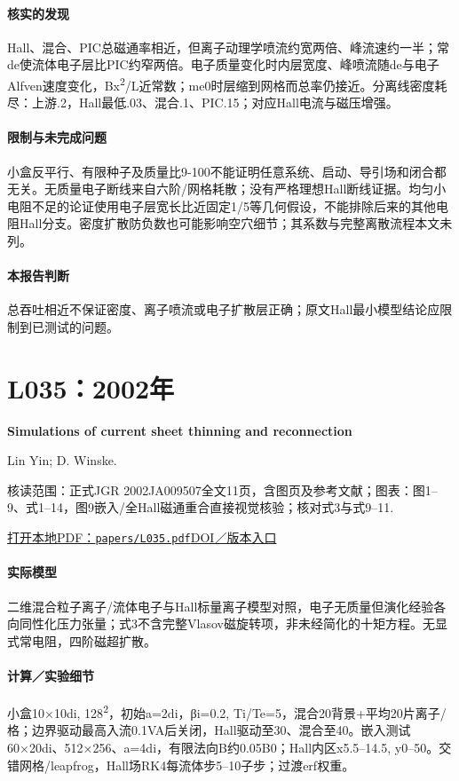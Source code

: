 \paragraph{核实的发现}Hall、混合、PIC总磁通率相近，但离子动理学喷流约宽两倍、峰流速约一半；常de使流体电子层比PIC约窄两倍。电子质量变化时内层宽度、峰喷流随de与电子Alfven速度变化，Bx\textsuperscript{2}/L近常数；me0时层缩到网格而总率仍接近。分离线密度耗尽：上游.2，Hall最低.03、混合.1、PIC.15；对应Hall电流与磁压增强。

\paragraph{限制与未完成问题}小盒反平行、有限种子及质量比9-100不能证明任意系统、启动、导引场和闭合都无关。无质量电子断线来自六阶/网格耗散；没有严格理想Hall断线证据。均匀小电阻不足的论证使用电子层宽长比近固定1/5等几何假设，不能排除后来的其他电阻Hall分支。密度扩散防负数也可能影响空穴细节；其系数与完整离散流程本文未列。

\paragraph{本报告判断}总吞吐相近不保证密度、离子喷流或电子扩散层正确；原文Hall最小模型结论应限制到已测试的问题。

\section{L035：2002年}\label{paper:L035}

\textbf{Simulations of current sheet thinning and reconnection}\citep{L035}\

Lin Yin;  D. Winske.

\textsf{核读范围：}正式JGR 2002JA009507全文11页，含图页及参考文献；\textsf{图表：}图1–9、式1–14，图9嵌入/全Hall磁通重合直接视觉核验；核对式3与式9–11.

\href{run:papers/L035.pdf}{打开本地PDF：\texttt{papers/L035.pdf}}\quad\href{https://doi.org/10.1029/2002ja009507}{DOI／版本入口}

\paragraph{实际模型}二维混合粒子离子/流体电子与Hall标量离子模型对照，电子无质量但演化经验各向同性化压力张量；式3不含完整Vlasov磁旋转项，非未经简化的十矩方程。无显式常电阻，四阶磁超扩散。

\paragraph{计算／实验细节}小盒10×10di, 128\textsuperscript{2}，初始a=2di，βi=0.2, Ti/Te=5，混合20背景+平均20片离子/格；边界驱动最高入流0.1VA后关闭，Hall驱动至30、混合至40。嵌入测试60×20di、512×256、a=4di，有限法向B约0.05B0；Hall内区x5.5–14.5, y0–50。交错网格/leapfrog，Hall场RK4每流体步5–10子步；过渡erf权重。


